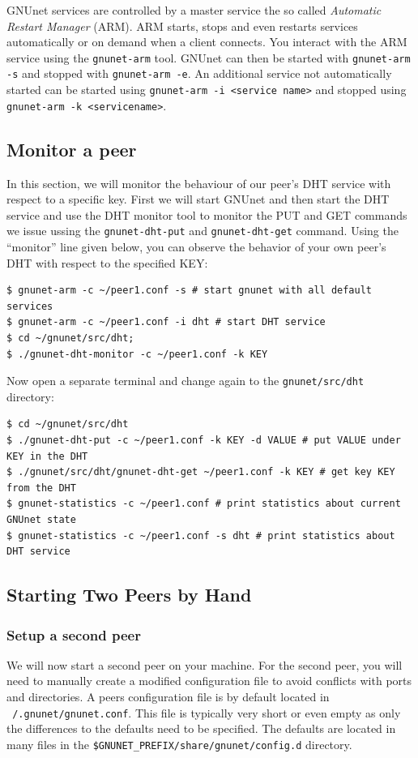 \documentclass[10pt]{article}
\begin{document}
GNUnet services are controlled by a master service the so called \textit{Automatic Restart Manager} (ARM).
ARM starts, stops and even restarts services automatically or on demand when a client connects.
You interact with the ARM service using the \lstinline|gnunet-arm| tool. 
GNUnet can then be started with \lstinline|gnunet-arm -s| and stopped with 
\lstinline|gnunet-arm -e|.  An additional service not automatically started 
can be started using \lstinline|gnunet-arm -i <service name>| and stopped 
using \lstinline|gnunet-arm -k <servicename>|. 

\subsection{Monitor a peer}
In this section, we will monitor the behaviour of our peer's DHT service with respect to a 
specific key. First we will start GNUnet and then start the DHT service and use the DHT monitor tool
to monitor the PUT and GET commands we issue ussing the \lstinline|gnunet-dht-put| and 
\lstinline|gnunet-dht-get| command. Using the ``monitor'' line given below, you can observe the behavior of
your own peer's DHT with respect to the specified KEY:

\lstset{language=bash}
\begin{lstlisting}
$ gnunet-arm -c ~/peer1.conf -s # start gnunet with all default services
$ gnunet-arm -c ~/peer1.conf -i dht # start DHT service
$ cd ~/gnunet/src/dht;
$ ./gnunet-dht-monitor -c ~/peer1.conf -k KEY
\end{lstlisting}
Now open a separate terminal and change again to the \lstinline|gnunet/src/dht| directory:
\begin{lstlisting}
$ cd ~/gnunet/src/dht
$ ./gnunet-dht-put -c ~/peer1.conf -k KEY -d VALUE # put VALUE under KEY in the DHT 
$ ./gnunet/src/dht/gnunet-dht-get ~/peer1.conf -k KEY # get key KEY from the DHT
$ gnunet-statistics -c ~/peer1.conf # print statistics about current GNUnet state
$ gnunet-statistics -c ~/peer1.conf -s dht # print statistics about DHT service
\end{lstlisting}
\subsection{Starting Two Peers by Hand}
\subsubsection{Setup a second peer}
We will now start a second peer on your machine.
For the second peer, you will need to manually create a modified
configuration file to avoid conflicts with ports and directories.  
A peers configuration file is by default located in {\tt ~/.gnunet/gnunet.conf}.
This file is typically very short or even empty as only the differences to the
defaults need to be specified.  The defaults are located in 
many files in the {\tt \$GNUNET\_PREFIX/share/gnunet/config.d} directory.
\end{document}
